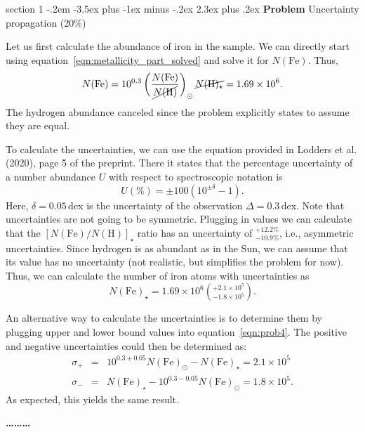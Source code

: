 \documentclass[letterpaper,12pt,twoside=false,DIV=13]{scrartcl}
\makeatletter
\newenvironment{problem}{\@startsection
    {section}
    {1}
    {-.2em}
    {-3.5ex plus -1ex minus -.2ex}
    {2.3ex plus .2ex}
    {
        \pagebreak[3] %
        \noindent\sffamily\bfseries Problem
    }
}
{
    \begin{center}\large\bfseries\ldots\ldots\ldots\end{center}
}
\makeatother
\begin{document}
\begin{problem}{Uncertainty propagation (20\%)}

Let us first calculate the abundance of iron in the sample. We can directly start using equation~\eqref{eqn:metallicity_part_solved} and solve it for $N(\mathrm{Fe})$. Thus,
\begin{equation} \label{eqn:prob4}
    N(\mathrm{Fe}) = 10^{0.3} \left(\frac{N(\mathrm{Fe})}{\cancel{N(\mathrm{H})}}\right)_\odot \cancel{N(\mathrm{H})_\star}
        = 1.69 \times 10^{6}.
\end{equation}
The hydrogen abundance canceled since the problem explicitly states to assume they are equal. 

To calculate the uncertainties, we can use the equation provided in Lodders et al. (2020), page 5 of the preprint. There it states that the percentage uncertainty of a number abundance $U$ with respect to spectroscopic notation is
\begin{equation}
    U(\%) = \pm 100 (10^{\pm\delta} -1).
\end{equation}
Here, $\delta=0.05$\,dex is the uncertainty of the observation $\Delta = 0.3$\,dex. Note that uncertainties are not going to be symmetric. Plugging in values we can calculate that the $[N(\mathrm{Fe}) / N(\mathrm{H})]_\star$ ratio has an uncertainty of $^{+12.2\%}_{-10.9\%}$, i.e., asymmetric uncertainties. Since hydrogen is as abundant as in the Sun, we can assume that its value has no uncertainty (not realistic, but simplifies the problem for now). Thus, we can calculate the number of iron atoms with uncertainties as
\begin{equation}
    N(\mathrm{Fe})_\star = 1.69 \times 10^{6} \left(^{+2.1 \times 10^{5}} _{-1.8 \times 10^{5}}\right).
\end{equation}

An alternative way to calculate the uncertainties is to determine them by plugging upper and lower bound values into equation~\eqref{eqn:prob4}. The positive and negative uncertainties could then be determined as:
\begin{eqnarray}
    \sigma_+ &=& 10^{0.3 + 0.05} N(\mathrm{Fe})_\odot - N(\mathrm{Fe})_\star = 2.1 \times 10^5 \\
    \sigma_- &=& N(\mathrm{Fe})_\star  - 10^{0.3 - 0.05} N(\mathrm{Fe})_\odot = 1.8 \times 10^5.
\end{eqnarray}
As expected, this yields the same result.

\end{problem}
\end{document}
